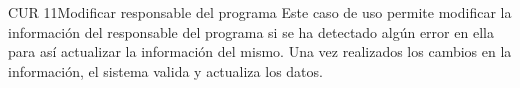 
\begin{UseCase}{CUR 11}{Modificar responsable del programa}
	{
		Este caso de uso permite modificar la información del responsable del programa si se ha detectado algún error en ella para así actualizar la información del mismo. Una vez realizados los cambios en la información, el sistema valida y actualiza los datos. 
	}




\end{UseCase}
